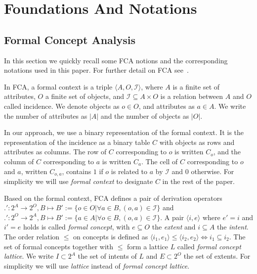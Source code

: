 \section{Foundations And Notations}\label{seq:notations}
\subsection{Formal Concept Analysis}\label{sec:fca}
In this section we quickly recall some FCA notions and the corresponding notations used in this paper.
For further detail on FCA see~\cite{fca-images:2017:ignatov}.

In FCA, a formal context is a triple $\langle A, O, \mathcal{I}\rangle $,
where $A$ is a finite set of attributes, $O$ a finite set of objects,
and $\mathcal{I} \subseteq A \times O$ is a relation between $A$ and $O$ called incidence.
We denote objects as $o \in O$, and attributes as $a \in A$.
We write the number of attributes as $|A|$ and the number of objects as $|O|$.

In our approach, we use a binary representation of the formal context.
It is the representation of the incidence as a binary table $C$ with objects as rows and attributes as columns.
The row of $C$ corresponding to $o$ is written $C_{o}$, and the column of $C$ corresponding to $a$ is written $C_{a}$.
The cell of $C$ corresponding to $o$ and $a$, written $C_{o,a}$, contains $1$ if $o$ is related to $a$ by $\mathcal{I}$ and $0$ otherwise.
For simplicity we will use \textit{formal context} to designate $C$ in the rest of the paper.

Based on the formal context, FCA defines a pair of derivation operators
$.': 2^A \rightarrow 2^O, B \mapsto B' := \{o\in O|\forall a\in B, (o, a) \in \mathcal{I}\}$
and $.': 2^O \rightarrow 2^A, B \mapsto B' := \{a\in A|\forall o\in B, (o, a) \in \mathcal{I}\}$.
%
A pair $\langle i, e\rangle$ where $e'=i$ and $i'=e$ holds is called \textit{formal concept}, with $e \subseteq O$ the \textit{extent} and $i \subseteq A$ the \textit{intent}.
The order relation $\leq$ on concepts is defined as $\langle i_1, e_1\rangle \leq \langle i_2, e_2\rangle \iff i_1 \subseteq i_2$.
The set of formal concepts together with $\leq$ form a lattice $L$ called \textit{formal concept lattice}.
We write $I \subset 2^A$ the set of intents of $L$ and $E \subset 2^O$ the set of extents.
For simplicity we will use \textit{lattice} instead of \textit{formal concept lattice}.

